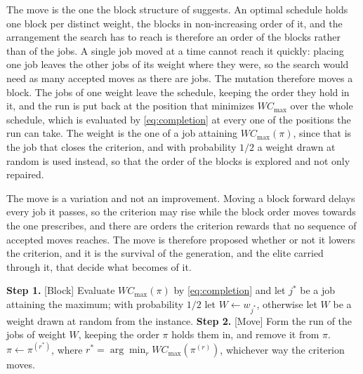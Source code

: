 \documentclass[12pt]{article}
\begin{document}
\begin{sloppypar}
        The move is the one the block structure of  suggests.  An optimal
        schedule holds one block per distinct weight, the blocks in non-increasing order of it, and
        the arrangement the search has to reach is therefore an order of the blocks rather than of the
        jobs.  A single job moved at a time cannot reach it quickly: placing one job leaves the other
        jobs of its weight where they were, so the search would need as many accepted moves as there
        are jobs.  The mutation therefore moves a block.  The jobs of one weight leave the schedule,
        keeping the order they hold in it, and the run is put back at the position that minimizes
        $W C_{\max}$ over the whole schedule, which is evaluated by \cref{eq:completion} at every one
        of the positions the run can take.  The weight is the one of a job attaining
        $W C_{\max}(\pi)$, since that is the job that closes the criterion, and with probability
        $1/2$ a weight drawn at random is used instead, so that the order of the blocks is explored and
        not only repaired.
        
        The move is a variation and not an improvement.  Moving a block forward delays every job it
        passes, so the criterion may rise while the block order moves towards the one
         prescribes, and there are orders the criterion rewards that no
        sequence of accepted moves reaches.  The move is therefore proposed whether or not it lowers
        the criterion, and it is the survival of the generation, and the elite carried through it,
        that decide what becomes of it.
        
        \begin{algorithm}[H]
            \small
            \linespread{1.2}\selectfont
            \SetAlgoLined
            \DontPrintSemicolon
            \caption{Block Mutation for $F2 \parallel W C_{\max}$}\label{alg:cm}
            \BlankLine
            \textbf{Step 1.} [Block] Evaluate $W C_{\max}(\pi)$ by \cref{eq:completion} and let $j^{*}$ be
            a job attaining the maximum; with probability $1/2$ let $W\gets w_{j^{*}}$, otherwise let
            $W$ be a weight drawn at random from the instance. \;
            \textbf{Step 2.} [Move] Form the run of the jobs of weight $W$, keeping the order $\pi$ holds
            them in, and remove it from $\pi$. \;
            $\pi\gets\pi^{(r^{*})}$, where $r^{*}=\arg\min_{r} W C_{\max}(\pi^{(r)})$, whichever way the
            criterion moves. \;
        \end{algorithm}
        

\end{sloppypar}
\end{document}

